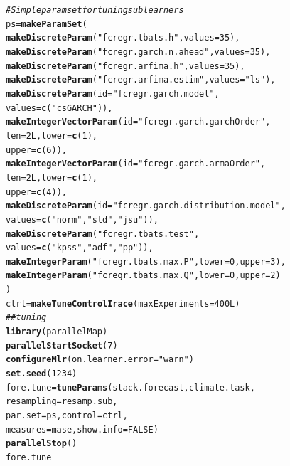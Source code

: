 \documentclass[12pt]{article}\usepackage[]{graphicx}\usepackage[]{color}
\makeatletter
\newcommand{\hlnum}[1]{\textcolor[rgb]{0.686,0.059,0.569}{#1}}%
\newcommand{\hlstr}[1]{\textcolor[rgb]{0.192,0.494,0.8}{#1}}%
\newcommand{\hlcom}[1]{\textcolor[rgb]{0.678,0.584,0.686}{\textit{#1}}}%
\newcommand{\hlstd}[1]{\textcolor[rgb]{0.345,0.345,0.345}{#1}}%
\newcommand{\hlkwb}[1]{\textcolor[rgb]{0.69,0.353,0.396}{#1}}%
\newcommand{\hlkwc}[1]{\textcolor[rgb]{0.333,0.667,0.333}{#1}}%
\newcommand{\hlkwd}[1]{\textcolor[rgb]{0.737,0.353,0.396}{\textbf{#1}}}%
\newenvironment{kframe}{%
 \def\at@end@of@kframe{}%
 \ifinner\ifhmode%
  \def\at@end@of@kframe{\end{minipage}}%
  \begin{minipage}{\columnwidth}%
 \fi\fi%
 \def\FrameCommand##1{\hskip\@totalleftmargin \hskip-\fboxsep
 \colorbox{shadecolor}{##1}\hskip-\fboxsep
     \hskip-\linewidth \hskip-\@totalleftmargin \hskip\columnwidth}%
 \MakeFramed {\advance\hsize-\width
   \@totalleftmargin\z@ \linewidth\hsize
   \@setminipage}}%
 {\par\unskip\endMakeFramed%
 \at@end@of@kframe}
\newenvironment{knitrout}{}{} %
\theoremstyle{definition}
\makeatother
\begin{document}
\singlespacing
\begin{knitrout}
\color{fgcolor}\begin{kframe}
\begin{alltt}
\hlcom{# Simple param set for tuning sub learners}
\hlstd{ps} \hlkwb{=} \hlkwd{makeParamSet}\hlstd{(}
  \hlkwd{makeDiscreteParam}\hlstd{(}\hlstr{"fcregr.tbats.h"}\hlstd{,} \hlkwc{values} \hlstd{=} \hlnum{35}\hlstd{),}
  \hlkwd{makeDiscreteParam}\hlstd{(}\hlstr{"fcregr.garch.n.ahead"}\hlstd{,} \hlkwc{values} \hlstd{=} \hlnum{35}\hlstd{),}
  \hlkwd{makeDiscreteParam}\hlstd{(}\hlstr{"fcregr.arfima.h"}\hlstd{,} \hlkwc{values} \hlstd{=} \hlnum{35}\hlstd{),}
  \hlkwd{makeDiscreteParam}\hlstd{(}\hlstr{"fcregr.arfima.estim"}\hlstd{,} \hlkwc{values} \hlstd{=} \hlstr{"ls"}\hlstd{),}
  \hlkwd{makeDiscreteParam}\hlstd{(}\hlkwc{id} \hlstd{=} \hlstr{"fcregr.garch.model"}\hlstd{,}
                    \hlkwc{values} \hlstd{=} \hlkwd{c}\hlstd{(}\hlstr{"csGARCH"}\hlstd{)),}
  \hlkwd{makeIntegerVectorParam}\hlstd{(}\hlkwc{id} \hlstd{=} \hlstr{"fcregr.garch.garchOrder"}\hlstd{,}
                         \hlkwc{len} \hlstd{=} \hlnum{2L}\hlstd{,} \hlkwc{lower} \hlstd{=} \hlkwd{c}\hlstd{(}\hlnum{1}\hlstd{),}
                         \hlkwc{upper} \hlstd{=} \hlkwd{c}\hlstd{(}\hlnum{6}\hlstd{)),}
  \hlkwd{makeIntegerVectorParam}\hlstd{(}\hlkwc{id} \hlstd{=} \hlstr{"fcregr.garch.armaOrder"}\hlstd{,}
                         \hlkwc{len} \hlstd{=} \hlnum{2L}\hlstd{,} \hlkwc{lower} \hlstd{=} \hlkwd{c}\hlstd{(}\hlnum{1}\hlstd{),}
                         \hlkwc{upper} \hlstd{=} \hlkwd{c}\hlstd{(}\hlnum{4}\hlstd{)),}
  \hlkwd{makeDiscreteParam}\hlstd{(}\hlkwc{id} \hlstd{=} \hlstr{"fcregr.garch.distribution.model"}\hlstd{,}
                    \hlkwc{values} \hlstd{=} \hlkwd{c}\hlstd{(}\hlstr{"norm"}\hlstd{,}\hlstr{"std"}\hlstd{,}\hlstr{"jsu"}\hlstd{)),}
  \hlkwd{makeDiscreteParam}\hlstd{(}\hlstr{"fcregr.tbats.test"}\hlstd{,}
                    \hlkwc{values} \hlstd{=} \hlkwd{c}\hlstd{(}\hlstr{"kpss"}\hlstd{,}\hlstr{"adf"}\hlstd{,}\hlstr{"pp"}\hlstd{)),}
  \hlkwd{makeIntegerParam}\hlstd{(}\hlstr{"fcregr.tbats.max.P"}\hlstd{,} \hlkwc{lower} \hlstd{=} \hlnum{0}\hlstd{,} \hlkwc{upper} \hlstd{=} \hlnum{3}\hlstd{),}
  \hlkwd{makeIntegerParam}\hlstd{(}\hlstr{"fcregr.tbats.max.Q"}\hlstd{,} \hlkwc{lower} \hlstd{=} \hlnum{0}\hlstd{,} \hlkwc{upper} \hlstd{=} \hlnum{2}\hlstd{)}
\hlstd{)}
\hlstd{ctrl} \hlkwb{=} \hlkwd{makeTuneControlIrace}\hlstd{(}\hlkwc{maxExperiments} \hlstd{=} \hlnum{400L}\hlstd{)}
\hlcom{## tuning}
\hlkwd{library}\hlstd{(parallelMap)}
\hlkwd{parallelStartSocket}\hlstd{(}\hlnum{7}\hlstd{)}
\hlkwd{configureMlr}\hlstd{(}\hlkwc{on.learner.error} \hlstd{=} \hlstr{"warn"}\hlstd{)}
\hlkwd{set.seed}\hlstd{(}\hlnum{1234}\hlstd{)}
\hlstd{fore.tune} \hlkwb{=} \hlkwd{tuneParams}\hlstd{(stack.forecast, climate.task,}
                       \hlkwc{resampling} \hlstd{= resamp.sub,}
                       \hlkwc{par.set} \hlstd{= ps,} \hlkwc{control} \hlstd{= ctrl,}
                       \hlkwc{measures} \hlstd{= mase,} \hlkwc{show.info} \hlstd{=} \hlnum{FALSE}\hlstd{)}
\hlkwd{parallelStop}\hlstd{()}
\hlstd{fore.tune}
\end{alltt}
\end{kframe}
\end{knitrout}
\end{document}
